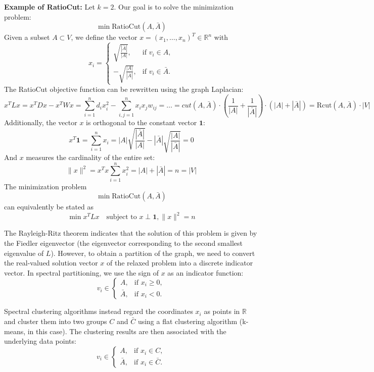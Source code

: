 \documentclass[unicode,11pt,a4paper,oneside,numbers=endperiod,openany]{scrartcl}
\begin{document}
\textbf{Example of RatioCut:}
Let \( k = 2 \). Our goal is to solve the minimization problem:
\[
\min \text{RatioCut}(A, \bar{A})
\]
Given a subset \( A \subset V \), we define the vector \( x = (x_1, \ldots, x_n)^T \in \mathbb{R}^n \) with
\[
x_i = \begin{cases}
    \sqrt{\frac{|\bar{A}|}{|A|}}, & \text{if } v_i \in A, \\
    -\sqrt{\frac{|A|}{|\bar{A}|}}, & \text{if } v_i \in \bar{A}.
\end{cases}
\]
The RatioCut objective function can be rewritten using the graph Laplacian:
\[
x^T L x = x^T D x - x^T W x = \sum_{i=1}^{n} d_i x^2_i - \sum_{i,j=1}^{n} x_i x_j w_{ij} = \ldots =cut(A,\bar{A})\cdot (\frac{1}{|A|}+\frac{1}{|\bar{A}|})\cdot (|A|+|\bar{A}|) =  \text{Rcut}(A,\bar{A}) \cdot |V|
\]
Additionally, the vector \( x \) is orthogonal to the constant vector \( \mathbf{1} \):
\[
x^T \mathbf{1} = \sum_{i=1}^{n} x_i = |A| \sqrt{\frac{|\bar{A}|}{|A|}} - |\bar{A}| \sqrt{\frac{|A|}{|\bar{A}|}} = 0
\]
And \( x \) measures the cardinality of the entire set:
\[
\|x\|^2 = x^T x  \sum_{i=1}^{n} x^2_i = |A| + |\bar{A}| = n = |V|
\]
The minimization problem
\[
\min \text{RatioCut}(A, \bar{A})
\]
can equivalently be stated as
\[
\min x^T L x \quad \text{subject to } x \perp \mathbf{1}, \|x\|^2 = n
\]

The Rayleigh-Ritz theorem indicates that the solution of this problem is given by the Fiedler eigenvector (the eigenvector corresponding to the second smallest eigenvalue of \( L \)). However, to obtain a partition of the graph, we need to convert the real-valued solution vector \( x \) of the relaxed problem into a discrete indicator vector. In spectral partitioning, we use the sign of \( x \) as an indicator function:
\[
v_i \in \begin{cases}
    A, & \text{if } x_i \geq 0, \\
    \bar{A}, & \text{if } x_i < 0.
\end{cases}
\]

Spectral clustering algorithms instead regard the coordinates \( x_i \) as points in \( \mathbb{R} \) and cluster them into two groups \( C \) and \( \bar{C} \) using a flat clustering algorithm (k-means, in this case). The clustering results are then associated with the underlying data points:
\[
v_i \in \begin{cases}
    A, & \text{if } x_i \in C, \\
    \bar{A}, & \text{if } x_i \in \bar{C}.
\end{cases}
\]
\end{document}

